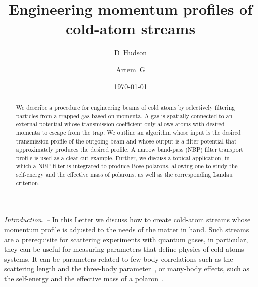 \documentclass[twocolumn,amsmath,amssymb,showpacs,prl,superscriptaddress,aps]{revtex4-1}
\begin{document}
\title{Engineering momentum profiles of cold-atom {\color{blue} streams}}

\author{D~Hudson }

\author{Artem~G }


\date{\today}

\begin{abstract}
We describe a procedure for engineering beams of cold atoms by selectively filtering particles from a trapped gas based on momenta.
A gas is spatially connected to an external potential whose transmission coefficient only allows atoms with desired momenta to escape from the trap. We outline an algorithm whose input is the desired
transmission profile of the outgoing beam and whose output is a filter potential that approximately produces the desired profile.
A narrow band-pass (NBP) filter transport profile is used as a clear-cut example. 
Further, we discuss a topical application, in which a NBP filter is integrated to produce Bose polarons, allowing one to study the self-energy and the effective mass of polarons, as well as the corresponding Landau criterion.
\end{abstract}


\maketitle



{\it Introduction. --}   
In this Letter we discuss how to create cold-atom streams whose momentum profile
is adjusted to the needs of the matter in hand.   
Such streams are a prerequisite for scattering experiments with quantum gases, in particular, 
they can be useful for measuring parameters that define
physics of cold-atoms systems. It can be parameters related to few-body correlations such as
the scattering length and the three-body parameter~\cite{braaten2006, bloch2008}, or
many-body effects, such as the self-energy and the effective mass of a polaron~\cite{massignan2014, schmidt2018}.
\end{document}
